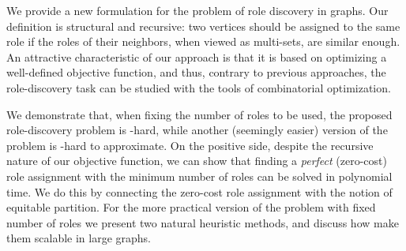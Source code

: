 
We provide a new formulation for the 
problem of role discovery in graphs. 
Our definition is structural and recursive: 
two vertices should be assigned to the same role
if the roles of their neighbors, when viewed as multi-sets, are similar enough.
An attractive characteristic of our approach 
is that it is based on optimizing a well-defined objective function, 
and thus, contrary to previous approaches, 
the role-discovery task can be studied with the tools of combinatorial optimization.

We demonstrate that, when fixing the number of roles to be used, 
the proposed role-discovery problem is \np-hard, 
while another (seemingly easier) version of the problem is \np-hard to approximate.
On the positive side, 
despite the recursive nature of our objective function, 
we can show that finding a \emph{perfect} (zero-cost) role assignment
with the minimum number of roles can be solved in polynomial time. 
We do this by connecting the zero-cost role assignment with the notion of equitable partition.
For the more practical version of the problem with fixed number of roles
we present two natural heuristic methods, 
and discuss how make them scalable in large graphs.
